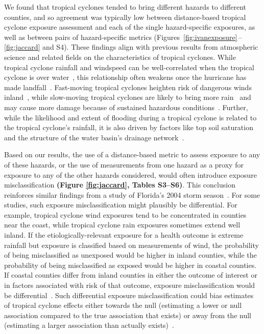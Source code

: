 We found that tropical cyclones tended to bring different hazards to different
counties, and so agreement was typically low between distance-based
tropical cyclone exposure assessment and each of the single hazard-specific
exposures, as well as between pairs of hazard-specific metrics
(Figures~\ref{fig:ivanexposure}\,--\,\ref{fig:jaccard} and S4).  These
findings align with previous results from atmospheric science and related
fields on the characteristics of tropical cyclones. While tropical cyclone
rainfall and windspeed can be well-correlated when the tropical cyclone is over
water~\parencite{cerveny2000}, this relationship often weakens once the
hurricane has made landfall~\parencite{jiang2008}.  Fast-moving tropical
cyclones heighten risk of dangerous winds inland~\parencite{kruk2010},
while slow-moving tropical cyclones are likely to bring more
rain~\parencite{rappaport2000} and may cause more damage because of sustained
hazardous conditions~\parencite{rezapour2014}. Further, while the likelihood
and extent of flooding during a tropical cyclone is related to the tropical
cyclone's rainfall, it is also driven by factors like top soil saturation and
the structure of the water basin's drainage network~\parencite{chen2015,
rees2001}. 

Based on our results, the use of a distance-based metric to assess exposure to
any of these hazards, or the use of measurements from one hazard as a proxy for
exposure to any of the other hazards considered, would often introduce exposure
misclassification \textbf{(Figure \ref{fig:jaccard}, Tables S3--S6)}. This
conclusion reinforces similar findings from a study of Florida's 2004 storm
season~\parencite{grabich2015measuring}.  For some studies, such exposure
misclassification might plausibly be differential.  For example, tropical
cyclone wind exposures tend to be concentrated in counties near the coast,
while tropical cyclone rain exposures sometimes extend well inland.  If the
etiologically-relevant exposure for a health outcome is extreme rainfall but
exposure is classified based on measurements of wind, the probability of being
misclassified as unexposed would be higher in inland counties, while the
probability of being misclassified as exposed would be higher in coastal
counties. If coastal counties differ from inland counties in either the outcome
of interest or in factors associated with risk of that outcome, exposure
misclassification would be differential~\parencite{savitz2016interpreting}.
Such differential exposure misclassification could bias estimates of tropical
cyclone effects either towards the null (estimating a lower or null association
compared to the true association that exists) or away from the null (estimating
a larger association than actually exists)~\parencite{savitz2016interpreting,
armstrong1998effect}.  

